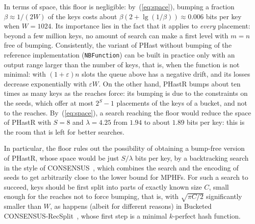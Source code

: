 \documentclass[11pt]{article}
\newcommand{\PHast}{PHast\xspace}
\newcommand{\PHastR}{PHastR\xspace}
\begin{document}
In terms of space, this floor is negligible: by~(\ref{eq:space}), bumping a
fraction $\beta\approx1/(2W)$ of the keys costs about
$\beta(2+\lg(1/\beta))\approx0.006$ bits per key when $W=1024$. Its
importance lies in the fact that it applies to \emph{every} placement:
beyond a few million keys, no amount of search can make a first level with
$m=n$ free of bumping. Consistently, the variant of \PHast without bumping of
the reference implementation (\texttt{NBFunction}) can be built in practice
only with an output range larger than the number of keys, that is, when the
function is not minimal: with $(1+\varepsilon)n$ slots the queue above has a
negative drift, and its losses decrease exponentially with $\varepsilon W$.
On the other hand, \PHastR bumps about ten times as many keys as the reaches
force: its bumping is due to the constraints on the seeds, which offer at most
$2^S-1$ placements of the keys of a bucket, and not to the reaches. By~(\ref{eq:space}),
a search reaching the floor would reduce the space of \PHastR with $S=8$ and
$\lambda=4.25$ from $1.94$ to about $1.89$ bits per key: this is the room
that is left for better searches.

In particular, the floor rules out the possibility of obtaining a bump-free
version of \PHastR, whose space would be just $S/\lambda$ bits per key, by a
backtracking search in the style of CONSENSUS~\cite{LSWCSESAMPH}, which
combines the search and the encoding of seeds to get arbitrarily close to the
lower bound for MPHFs. For such a search to succeed, keys should be first
split into parts of exactly known size $C$, small enough for the reaches not
to force bumping, that is, with $\sqrt{\pi C/2}$ significantly smaller than
$W$, as happens (albeit for different reasons) in Bucketed
CONSENSUS-RecSplit~\cite{LSWCSESAMPH}, whose first step is a minimal
$k$-perfect hash function.

\end{document}
